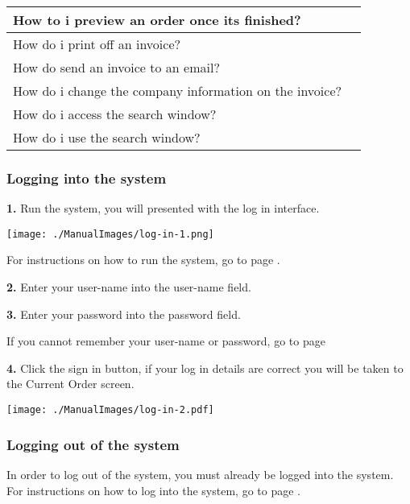 \begin{center}
\begin{longtable}{|p{8cm}|p{3cm}|}
	How to i preview an order once its finished?&  \pageref{fig:Previewing the invoice} \\ \hline
	How do i print off an invoice?&  \pageref{fig:Printing an invoice} \\ \hline
	How do send an invoice to an email?&  \pageref{fig:Emailing an invoice} \\ \hline
	How do i change the company information on the invoice? &  \pageref{fig:Changing information on the invoice} \\ \hline
	How do i access the search window?&  \pageref{fig:Accessing the search window} \\ \hline
	How do i use the search window?&  \pageref{fig:Using the search window} \\ \hline
	\end{longtable}
\end{center}
\pagebreak

\subsubsection{Logging into the system}
\label{fig:Logging into the system}

\textbf{1.} Run the system, you will presented with the log in interface.
 
\texttt{[image: ./ManualImages/log-in-1.png]}
  
For instructions on how to run the system, go to page \pageref{fig:Running the System}.

\textbf{2.} Enter your user-name into the user-name field.

\textbf{3.} Enter your password into the password field.

If you cannot remember your user-name or password, go to page \pageref{fig:Forgetting Your User-name or Password}

\textbf{4.} Click the sign in button, if your log in details are correct you will be taken to the Current Order screen.

\texttt{[image: ./ManualImages/log-in-2.pdf]}

\pagebreak
\subsubsection{Logging out of the system}
\label{fig:Logging out of the system}

In order to log out of the system, you must already be logged into the system. For instructions on how to log into the system, go to page \pageref{fig:Logging into the system}.


